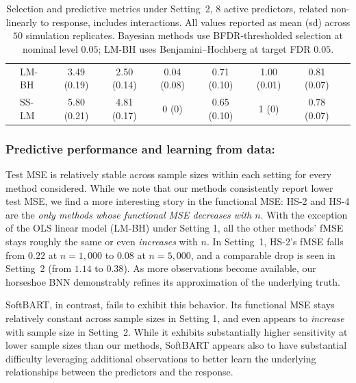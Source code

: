 {\begin{table}[h]
\begin{tabular}{@{}l l c c c c c c c@{}}
 & LM-BH        & 3.49 (0.19) & 2.50 (0.14) & 0.04 (0.08) & 0.71 (0.10) & 1.00 (0.01) & 0.81 (0.07) \\
 & SS-LM        & 5.80 (0.21) & 4.81 (0.17) & 0 (0) & 0.65 (0.10) & 1 (0) & 0.78 (0.07) \\
\bottomrule
\end{tabular}
\caption{Selection and predictive metrics under Setting~2, 8 active predictors, related non-linearly to response, includes interactions. 
All values reported as mean (sd) across $50$ simulation replicates.  Bayesian methods use BFDR-thresholded selection at nominal level $0.05$; LM-BH uses Benjamini--Hochberg at target FDR $0.05$.}
\label{tab:ch3-setting2}
\end{table}



\subsubsection*{Predictive performance and learning from data:}
Test MSE is relatively stable across sample sizes within each setting for every method considered.  
While we note that our methods consistently report lower test MSE, 
we find a more interesting story in the functional MSE: HS-2 and HS-4 are
the \emph{only methods whose functional MSE decreases
with $n$}.  With the exception of the OLS linear model (LM-BH) under Setting 1, 
all the other methods' fMSE stays roughly the same or even \emph{increases} with $n$.
In Setting~1, HS-2's fMSE falls from $0.22$ at $n=1{,}000$
to $0.08$ at $n=5{,}000$, and a comparable drop is seen in Setting~2
(from $1.14$ to $0.38$). As more observations become available, our
horseshoe BNN demonstrably refines its approximation of the
underlying truth.

SoftBART, in contrast, fails to exhibit this behavior. Its functional
MSE stays relatively constant across sample sizes in Setting 1, and even appears to
\emph{increase} with sample size in Setting~2.  While it exhibits substantially higher sensitivity
at lower sample sizes than our methods, SoftBART appears also to have substantial difficulty
leveraging additional observations to better learn the underlying relationships
between the predictors and the response.




}
